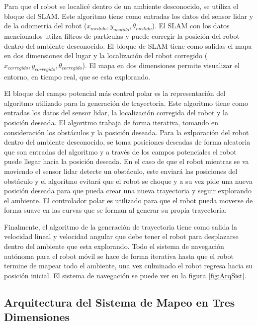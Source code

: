 Para que el robot se localicé dentro de un ambiente desconocido, se utiliza el bloque del SLAM. 
Este algoritmo tiene como entradas los datos del sensor lidar y de la odometría del robot 
($x_{medido},y_{medido},\theta_{medido}$). El SLAM con los datos mencionados utilza filtros de 
partículas y puede corregir la posición del robot dentro del ambiente desconocido. El 
bloque de SLAM tiene como salidas el mapa en dos dimensiones del lugar y la localización del robot 
corregido ($x_{corregido},y_{corregido},\theta_{corregido}$). El mapa en dos dimensiones permite
visualizar el entorno, en tiempo real, que se esta explorando.

El bloque del campo potencial más control polar es la representación del algoritmo utilizado
para la generación de trayectoria. Este algoritmo tiene como entradas los datos del sensor 
lidar, la localización corregida del robot y la posición deseada. El algoritmo trabaja de forma 
iterativa, tomando en consideración los obstáculos y la posición deseada. Para la exlporación del 
robot dentro del ambiente desconocido, se toma posiciones deseadas de forma aleatoria que son
entradas del algoritmo y a través de los campos potenciales el robot puede llegar hacia la posición 
deseada. En el caso de que el robot mientras se va moviendo el sensor lidar detecte un obstáculo, 
este enviará las posiciones del obstáculo y el algoritmo evitará que el robot se choque y a su vez
pide una nueva posición deseada para que pueda crear una nueva trayectoria y seguir explorando el 
ambiente. El controlador polar es utilizado para que el robot pueda moverse de forma suave en las 
curvas que se forman al generar su propia trayectoria.

Finalmente, el algoritmo de la generación de trayectoria tiene como salida la velocidad lineal y 
velocidad angular que debe tener el robot para desplazarse dentro del ambiente que esta explorando. Todo 
el sistema de navegación autónoma para el robot móvil se hace de forma iterativa hasta que el robot 
termine de mapear todo el ambiente, una vez culminado el robot regresa hacia su posición inicial. El 
sistema de navegación se puede ver en la figura \ref{fig:ArqSist}.


\subsection{Arquitectura del Sistema de Mapeo en Tres Dimensiones}

